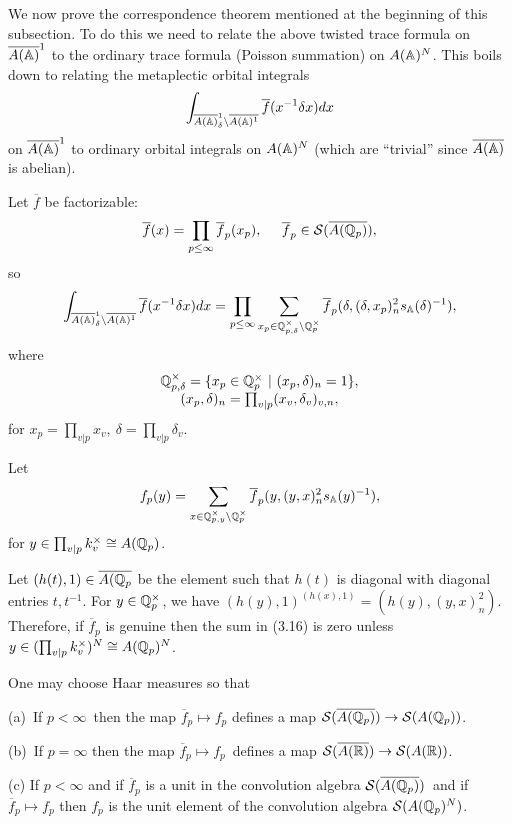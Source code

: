 We now prove the correspondence theorem mentioned at the beginning of this
subsection. To do this we need to relate the above twisted trace
formula on $\overline{A({\Bbb{A}})}^1$ to the ordinary trace
formula (Poisson summation) on $A({\Bbb{A}})^N$. This boils down to
relating the metaplectic orbital integrals 
\[
\int_{\overline{A({\Bbb{A}})}_\delta ^1
\backslash \overline{A({\Bbb{A}})^1}}
\overline{f}(x^{-1}\delta x)dx
\]
on $\overline{A({\Bbb{A}})}^1$ to ordinary orbital integrals
on $A({\Bbb{A}})^N$ (which are ``trivial'' since
$\overline{A({\Bbb{A}})}$ is abelian).

Let $\overline{f}$ be factorizable: 
\[
\overline{f}(x)=\prod_{p\leq \infty}\overline{f}_p(x_p),
\;\;\;\;\;\overline{f}_p\in {\cal{S}}(\overline{A({\Bbb{Q}}_p)}),
\]
so 
\begin{equation}
\int_{\overline{A({\Bbb{A}})}_\delta ^1
\backslash \overline{A({\Bbb{A}})^1}}
\overline{f}(x^{-1}\delta x)dx
=\prod_{p\leq \infty}
\sum_{x_p\in {\Bbb{Q}}_{p,\delta}^\times
\backslash {\Bbb{Q}}_p^\times}
\overline{f}_p(\delta ,(\delta,x_p)_n^2s_{\Bbb{A}}(\delta)^{-1} ),
\end{equation}
where
\[
\begin{array}{c}
{\Bbb{Q}}_{p,\delta}^\times
=\{x_p\in {\Bbb{Q}}_p^\times
\ |\ (x_p,\delta )_n=1\},\\
(x_p,\delta)_n=\prod_{v|p}(x_v,\delta_v)_{v,n},
\end{array}
\]
for $x_p=\prod_{v|p}x_v,\ \delta=\prod_{v|p}\delta_v$.
 
Let 
\begin{equation}
f_p(y)=
\sum_{x\in {\Bbb{Q}}_{p,y}^\times
\backslash {\Bbb{Q}}_p^\times}
\overline{f}_p(y ,(y,x)_n^2s_{\Bbb{A}}(y)^{-1} ),
\end{equation}
for $y\in \prod_{v|p}k_v^\times\cong A({\Bbb{Q}}_p)$.

\begin{remark}
Let $(h(t),1)\in \overline{A({\Bbb{Q}}_p}$ be the element
such that $h(t)$ is diagonal with diagonal entries $t,t^{-1}$.
For $y\in {\Bbb{Q}}_p^\times$, we have
$(h(y),1)^{(h(x),1)}=
(h(y) ,(y,x)_n^2) $.
Therefore, if $\overline{f}_p$ is genuine then
the sum in (3.16) is zero unless
$y\in (\prod_{v|p}k_v^\times)^N\cong A({\Bbb{Q}}_p)^N$.
\end{remark}

\begin{lemma}
One may choose Haar measures so that

(a)\ If $p<\infty $\ then the map $\overline{f}_p\longmapsto f_p$
defines a map ${{\cal{S}}}(\overline{A({{\Bbb{Q}}}_p)})\rightarrow
{{\cal{S}}}(A({{\Bbb{Q}}}_p))$.

(b)\ If $p=\infty$ then the map
$\overline{f}_p\longmapsto f_p$\ defines a map
${{\cal{S}}}(\overline{A(\Bbb{R})})
\rightarrow {{\cal{S}}}(A({\Bbb{R}}))$.

(c) If $p<\infty $ and if $\overline{f}_p$
is a unit in the convolution
algebra ${\cal{S}}(\overline{A({\Bbb{Q}}_p)})$\ and
if $\overline{f}_p\longmapsto f_p$ then $f_p$
is the unit element of
the convolution algebra ${\cal{S}}(A({\Bbb{Q}}_p)^N)$.
\end{lemma}

